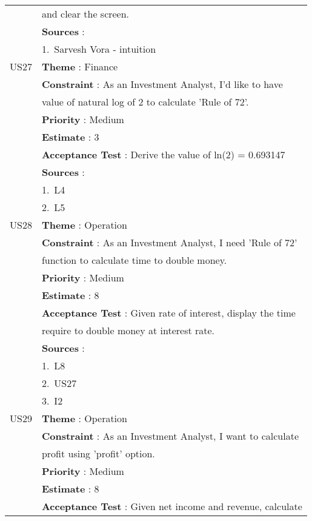 \documentclass{article}
\begin{document}
\begin{longtable}{|| c || l ||}
         & and clear the screen.\\
         & \textbf{Sources} : \\
         & 1.~Sarvesh Vora - intuition \\
         \hline
         \hline
         US27 & \textbf{Theme} : Finance \\
         & \textbf{Constraint} : As an Investment Analyst, I'd like to have \\
         & value of natural log of 2 to calculate 'Rule of 72'.\\
         & \textbf{Priority} : Medium \\
         & \textbf{Estimate} : 3 \\
         & \textbf{Acceptance Test} : Derive the value of ln(2) = 0.693147\\
         & \textbf{Sources} : \\
         & 1.~L4\\
         & 2.~L5\\
         \hline
         US28 & \textbf{Theme} : Operation \\
         & \textbf{Constraint} : As an Investment Analyst, I need 'Rule of 72' \\
         & function to calculate time to double money.\\
         & \textbf{Priority} : Medium \\
         & \textbf{Estimate} : 8 \\
         & \textbf{Acceptance Test} : Given rate of interest, display the time\\
         & require to double money at interest rate.\\
         & \textbf{Sources} : \\
         & 1.~L8\\
         & 2.~US27\\
         & 3.~I2 \\
         \hline
         \newpage
         \hline
         US29 & \textbf{Theme} : Operation \\
         & \textbf{Constraint} : As an Investment Analyst, I want to calculate \\
         & profit using 'profit' option.\\
         & \textbf{Priority} : Medium \\
         & \textbf{Estimate} : 8 \\
         & \textbf{Acceptance Test} : Given net income and revenue, calculate\\

\end{longtable}
\end{document}
